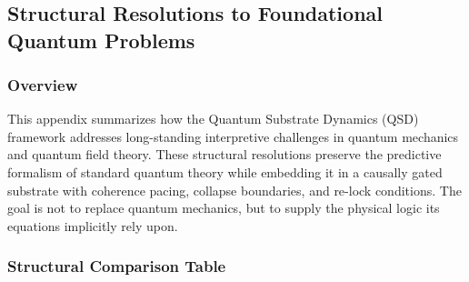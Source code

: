 \documentclass[preprints,article,submit,pdftex,moreauthors]{Definitions/mdpi}
\begin{document}
\newpage
\appendixstart
\appendix
\section[\appendixname~\thesection]{}
\subsection[\appendixname~\thesubsection]{Structural Resolutions to Foundational Quantum Problems}

\subsubsection{Overview}

This appendix summarizes how the Quantum Substrate Dynamics (QSD) framework addresses long-standing interpretive challenges in quantum mechanics and quantum field theory. These structural resolutions preserve the predictive formalism of standard quantum theory while embedding it in a causally gated substrate with coherence pacing, collapse boundaries, and re-lock conditions. The goal is not to replace quantum mechanics, but to supply the physical logic its equations implicitly rely upon.

\subsubsection{Structural Comparison Table}
\end{document}
